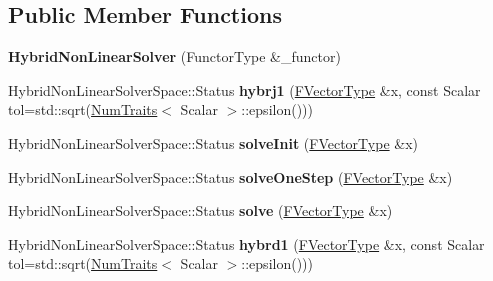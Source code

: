 \subsection*{Public Member Functions}
\begin{DoxyCompactItemize}
\item 
\mbox{\label{class_eigen_1_1_hybrid_non_linear_solver_aaf90e23a6bad869ca1a9cadf62af0dd4}} 
{\bfseries Hybrid\+Non\+Linear\+Solver} (Functor\+Type \&\+\_\+functor)
\item 
\mbox{\label{class_eigen_1_1_hybrid_non_linear_solver_a1b5eddcc7f215e790b740ad94f0e4389}} 
Hybrid\+Non\+Linear\+Solver\+Space\+::\+Status {\bfseries hybrj1} (\hyperlink{group___core___module}{F\+Vector\+Type} \&x, const Scalar tol=std\+::sqrt(\hyperlink{group___core___module_struct_eigen_1_1_num_traits}{Num\+Traits}$<$ Scalar $>$\+::epsilon()))
\item 
\mbox{\label{class_eigen_1_1_hybrid_non_linear_solver_a197044e0f63c1077846a0279e47e934f}} 
Hybrid\+Non\+Linear\+Solver\+Space\+::\+Status {\bfseries solve\+Init} (\hyperlink{group___core___module}{F\+Vector\+Type} \&x)
\item 
\mbox{\label{class_eigen_1_1_hybrid_non_linear_solver_a64c9d49fa4645ad58a45dedcb1491252}} 
Hybrid\+Non\+Linear\+Solver\+Space\+::\+Status {\bfseries solve\+One\+Step} (\hyperlink{group___core___module}{F\+Vector\+Type} \&x)
\item 
\mbox{\label{class_eigen_1_1_hybrid_non_linear_solver_a4e1cfd23e2ee4c7e16ed0fd353b3807e}} 
Hybrid\+Non\+Linear\+Solver\+Space\+::\+Status {\bfseries solve} (\hyperlink{group___core___module}{F\+Vector\+Type} \&x)
\item 
\mbox{\label{class_eigen_1_1_hybrid_non_linear_solver_ac901db3e3eacb7f17537d40e6703d1e4}} 
Hybrid\+Non\+Linear\+Solver\+Space\+::\+Status {\bfseries hybrd1} (\hyperlink{group___core___module}{F\+Vector\+Type} \&x, const Scalar tol=std\+::sqrt(\hyperlink{group___core___module_struct_eigen_1_1_num_traits}{Num\+Traits}$<$ Scalar $>$\+::epsilon()))
\item 

\end{DoxyCompactItemize}
